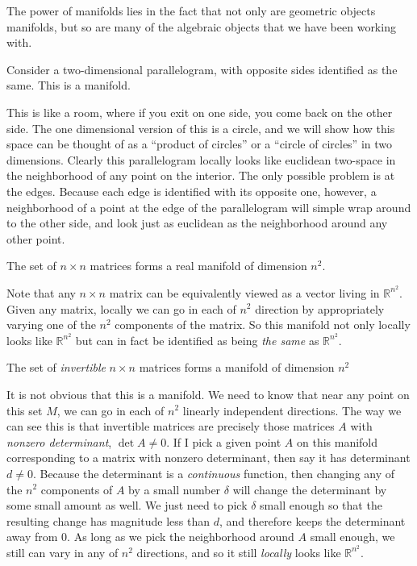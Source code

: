 \documentclass[../master.tex]{subfiles}
\begin{document}
	The power of manifolds lies in the fact that not only are geometric objects manifolds, but so are many of the algebraic objects that we have been working with. 
	
	\begin{example}\label{ex:secret_torus}
		Consider a two-dimensional parallelogram, with opposite sides identified as the same. This is a manifold.
	\end{example}
	
	
	This is like a room, where if you exit on one side, you come back on the other side. The one dimensional version of this is a circle, and we will show how this space can be thought of as a ``product of circles'' or a ``circle of circles'' in two dimensions. Clearly this parallelogram locally looks like euclidean two-space in the neighborhood of any point on the interior. The only possible problem is at the edges. Because each edge is identified with its opposite one, however, a neighborhood of a point at the edge of the parallelogram will simple wrap around to the other side, and look just as euclidean as the neighborhood around any other point.
	
	\begin{example}\label{ex:M_n}
		The set of $n \times n$ matrices forms a real manifold of dimension $n^2$.
	\end{example}
	Note that any $n \times n$ matrix can be equivalently viewed as a vector living in $\mathbb R^{n^2}$. Given any matrix, locally we can go in each of $n^2$ direction by appropriately varying one of the $n^2$ components of the matrix. So this manifold not only locally looks like $\mathbb R^{n^2}$ but can in fact be identified as being \emph{the same} as $\mathbb R^{n^2}$.
	
	\begin{example}\label{ex:GL_n}
		The set of \emph{invertible} $n\times n$ matrices forms a manifold of dimension $n^2$
	\end{example}
	It is not obvious that this is a manifold. We need to know that near any point on this set $M$, we can go in each of $n^2$ linearly independent directions. The way we can see this is that invertible matrices are precisely those matrices $A$ with \emph{nonzero determinant}, $\det A \neq 0$. If I pick a given point $A$ on this manifold corresponding to a matrix with nonzero determinant, then say it has determinant $d \neq 0$. Because the determinant is a \emph{continuous} function, then changing any of the $n^2$ components of $A$ by a small number $\delta$ will change the determinant by some small amount as well. We just need to pick $\delta$ small enough so that the resulting change has magnitude less than $d$, and therefore keeps the determinant away from $0$. As long as we pick the neighborhood around $A$ small enough, we still can vary in any of $n^2$ directions, and so it still \emph{locally} looks like $\mathbb R^{n^2}$. 
	
\end{document}
